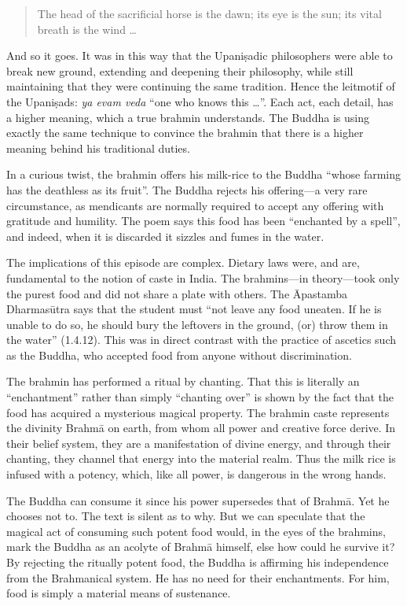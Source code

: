 \documentclass[12pt,openany]{book}%
\begin{document}
\begin{quotation}%
The head of the sacrificial horse is the dawn; its eye is the sun; its vital breath is the wind …

%
\end{quotation}

And so it goes. It was in this way that the \textsanskrit{Upaniṣadic} philosophers were able to break new ground, extending and deepening their philosophy, while still maintaining that they were continuing the same tradition. Hence the leitmotif of the \textsanskrit{Upaniṣads}: \textit{ya evam veda} “one who knows this …”. Each act, each detail, has a higher meaning, which a true brahmin understands. The Buddha is using exactly the same technique to convince the brahmin that there is a higher meaning behind his traditional duties.

In a curious twist, the brahmin offers his milk-rice to the Buddha “whose farming has the deathless as its fruit”. The Buddha rejects his offering—a very rare circumstance, as mendicants are normally required to accept any offering with gratitude and humility. The poem says this food has been “enchanted by a spell”, and indeed, when it is discarded it sizzles and fumes in the water.

The implications of this episode are complex. Dietary laws were, and are, fundamental to the notion of caste in India. The brahmins—in theory—took only the purest food and did not share a plate with others. The Āpastamba \textsanskrit{Dharmasūtra} says that the student must “not leave any food uneaten. If he is unable to do so, he should bury the leftovers in the ground, (or) throw them in the water” (1.4.12). This was in direct contrast with the practice of ascetics such as the Buddha, who accepted food from anyone without discrimination.

The brahmin has performed a ritual by chanting. That this is literally an “enchantment” rather than simply “chanting over” is shown by the fact that the food has acquired a mysterious magical property. The brahmin caste represents the divinity \textsanskrit{Brahmā} on earth, from whom all power and creative force derive. In their belief system, they are a manifestation of divine energy, and through their chanting, they channel that energy into the material realm. Thus the milk rice is infused with a potency, which, like all power, is dangerous in the wrong hands.

The Buddha can consume it since his power supersedes that of \textsanskrit{Brahmā}. Yet he chooses not to. The text is silent as to why. But we can speculate that the magical act of consuming such potent food would, in the eyes of the brahmins, mark the Buddha as an acolyte of \textsanskrit{Brahmā} himself, else how could he survive it? By rejecting the ritually potent food, the Buddha is affirming his independence from the Brahmanical system. He has no need for their enchantments. For him, food is simply a material means of sustenance.
\end{document}
